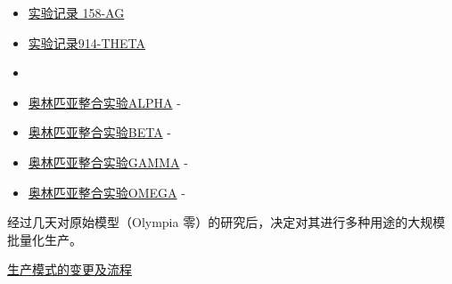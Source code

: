 
\begin{itemize}
\item \hyperref[sec:DOC-experiment-log-158-ag]{实验记录 158-AG}
\item \hyperref[sec:DOC-experiment-log-914-theta]{实验记录914-THETA}
\item {}\bb{{[}程序中的此步骤由于技术上的困难而废除]}
\end{itemize}


\begin{itemize}
\item \hyperref[chap:TALE-olympia-integration-experiment-alpha]{奥林匹亚整合实验ALPHA} - 
\item \hyperref[chap:TALE-olympia-integration-experiment-beta]{奥林匹亚整合实验BETA} - 
\item \hyperref[chap:TALE-olympia-integration-experiment-gamma]{奥林匹亚整合实验GAMMA} - 
\item \hyperref[chap:TALE-olympia-integration-experiment-omega]{奥林匹亚整合实验OMEGA} - 
\end{itemize}


经过几天对原始模型（Olympia 零）的研究后，决定对其进行多种用途的大规模批量化生产。

\hyperref[chap:TALE-production-model-changes-and-procedures]{生产模式的变更及流程}
